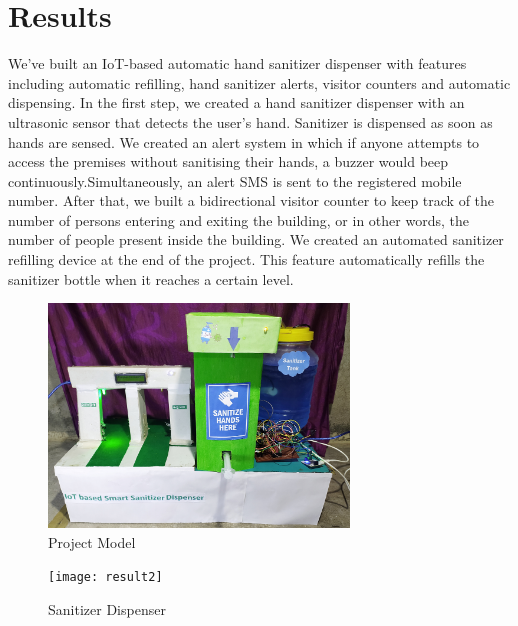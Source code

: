 \newpage
\thispagestyle{empty}

\chapter{Results}

	\hspace{0.5cm} We've built an IoT-based automatic hand sanitizer dispenser with features including automatic refilling, hand sanitizer alerts, visitor counters and automatic dispensing.
	In the first step, we created a hand sanitizer dispenser with an    ultrasonic sensor that detects the user's hand. Sanitizer is dispensed as soon as hands are sensed. We created an alert system in which if anyone attempts to access the premises without sanitising their hands, a buzzer would beep continuously.Simultaneously, an alert SMS is sent to the registered mobile number. 
	After that, we built a bidirectional visitor counter to keep track of the number of persons entering and exiting the building, or in other words, the number of people present inside the building. We created an automated sanitizer refilling device at the end of the project. This feature automatically refills the sanitizer bottle when it reaches a certain level.
	
\newpage

	\begin{figure}[h]
		\centering
	\includegraphics[width=80mm,scale=1]{result1}
	\caption{Project Model}
	\label{Project Model}
	
\end{figure}

\vspace{1cm}
	\begin{figure}[h]
		\centering
	\texttt{[image: result2]}
	\caption{Sanitizer Dispenser}
	\label{Sanitizer Dispenser}
	
\end{figure}

\newpage

